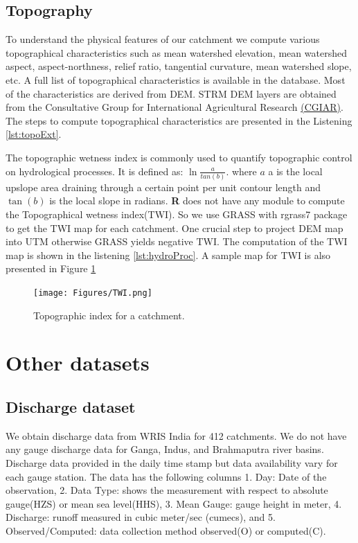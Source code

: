\documentclass[a4paper, 12pt]{article}
\begin{document}
\subsection{Topography} 
To understand the physical features of our catchment we compute various topographical characteristics such as mean watershed elevation, mean watershed aspect, aspect-northness, relief ratio, tangential curvature, mean watershed slope, etc. A full list of topographical characteristics is available in the database. Most of the characteristics are derived from DEM. STRM DEM layers are obtained from the Consultative Group for International Agricultural Research \href{http://srtm.csi.cgiar.org/SELECTION/inputCoord.asp}{(CGIAR)}. The steps to compute topographical characteristics are presented in the Listening \ref{lst:topoExt}. 

The topographic wetness index is commonly used to quantify topographic control on hydrological processes. It is defined as: $\ln{\frac{a}{tan(b)}}$. where ${\displaystyle a}$ a is the local upslope area draining through a certain point per unit contour length and ${\displaystyle \tan (b)}$ is the local slope in radians. \textbf{R} does not have any module to compute the Topographical wetness index(TWI). So we use GRASS with rgrass7 package to get the TWI map for each catchment. One crucial step to project DEM map into UTM otherwise GRASS yields negative TWI. The computation of the TWI map is shown in the listening \ref{lst:hydroProc}. A sample map for TWI is also presented in Figure \ref{fig:twi}

\begin{figure}[!h]
\centering
\texttt{[image: Figures/TWI.png]}
\caption{Topographic index for a catchment.}
\label{fig:twi}
\end{figure}

\clearpage
\section{Other datasets}
\subsection{Discharge dataset}\label{sec:dd} %
We obtain discharge data from WRIS India for 412 catchments. We do not have any gauge discharge data for Ganga, Indus, and Brahmaputra river basins. Discharge data provided in the daily time stamp but data availability vary for each gauge station. The data has the following columns 1. Day: Date of the observation, 2. Data Type: shows the measurement with respect to absolute gauge(HZS) or mean sea level(HHS), 3. Mean Gauge: gauge height in meter, 4. Discharge: runoff measured in cubic meter/sec (cumecs), and 5. Observed/Computed: data collection method observed(O) or computed(C).
\end{document}
